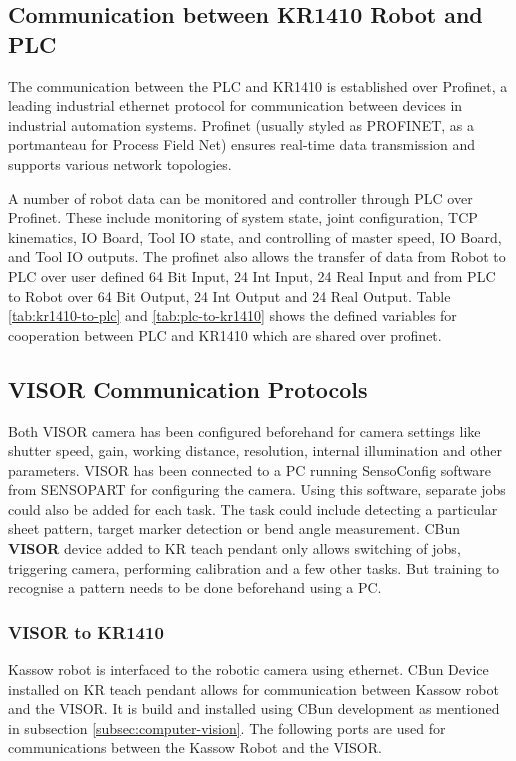 \subsection{Communication between KR1410 Robot and PLC}
The communication between the PLC and KR1410 is established over Profinet, a leading industrial ethernet protocol for communication between devices in industrial automation systems. Profinet (usually styled as PROFINET, as a portmanteau for Process Field Net) ensures real-time data transmission and supports various network topologies. \cite{profinet}

A number of robot data can be monitored and controller through PLC over Profinet. These include monitoring of system state, joint configuration,
TCP kinematics, IO Board, Tool IO state, and controlling of master speed, IO Board, and Tool IO outputs. The profinet also allows the transfer of
data from Robot to PLC over user defined 64 Bit Input, 24 Int Input, 24 Real Input and from PLC to Robot over 64 Bit Output, 24 Int Output and 24 Real Output. \cite{kr-profinet} Table \ref{tab:kr1410-to-plc} and \ref{tab:plc-to-kr1410} shows the defined variables for cooperation between PLC and KR1410 which are shared over profinet.


\subsection{VISOR Communication Protocols}
Both VISOR camera has been configured beforehand for camera settings like shutter speed, gain, working distance, resolution, internal illumination and other parameters. VISOR has been connected to a PC running SensoConfig software from SENSOPART for configuring the camera.
Using this software, separate jobs could also be added for each task. The task could include detecting a particular sheet pattern, target marker detection or bend angle measurement. CBun \textbf{VISOR} device added to KR teach pendant only allows switching of jobs, triggering camera,
performing calibration and a few other tasks. But training to recognise a pattern needs to be done beforehand using a PC.

\subsubsection{VISOR to KR1410}
Kassow robot is interfaced to the robotic camera using ethernet.
CBun Device installed on KR teach pendant allows for communication between
Kassow robot and the VISOR. It is build and installed using CBun development as mentioned in subsection \ref{subsec:computer-vision}. The following ports are used for communications between the Kassow Robot and the VISOR. 

